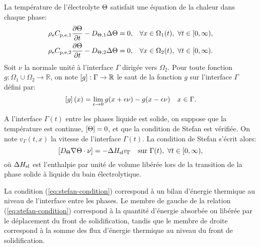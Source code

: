 La température de l'électrolyte $\Theta$ satisfait une équation
de la chaleur dans chaque phase:
\begin{align}
  &\rho_\mathrm{e}C_{\mathrm{p,e,1}} \frac{\partial
    \Theta}{\partial t} - D_{\Theta,\mathrm{1}} \Delta\Theta
  = 0, & \forall x \in \Omega_1(t),\ \forall t\in [0,\infty),\label{eq:heat-solid-phase}\\
    &\rho_\mathrm{e}C_{\mathrm{p,e,2}} \frac{\partial
    \Theta}{\partial t} - D_{\Theta,\mathrm{2}} \Delta\Theta
  = 0, & \forall x \in \Omega_2(t),\ \forall t\in [0,\infty).\label{eq:heat-liquid-phase}
\end{align}
Soit $\nu$ la normale unité à l'interface $\Gamma$ dirigée vers
$\Omega_2$. Pour toute fonction $g:\Omega_1\cup\Omega_2\to\mathbb R$,
on note $\left[ g \right]:\Gamma\to\mathbb R$ le saut de la fonction $g$ sur
l'interface $\Gamma$ défini par:
\begin{equation}
  \left[ g \right](x) = \lim_{\epsilon\to 0}g(x + \epsilon\nu) - g(x -
  \epsilon\nu) \quad x\in \Gamma.
\end{equation}

A l'interface $\Gamma(t)$ entre les phases liquide est solide, on
suppose que la température est continue, $\left[ \Theta \right] = 0$, et
que la condition de Stefan est vérifiée. On note $v_\Gamma(t, x)$ la
vitesse de l'interface $\Gamma(t)$. La condition de Stefan s'écrit
alors:
\begin{equation}
  \jump{\electrolytetdiff\nabla\temperature \cdot \nu} %
  = - \fusionenthalpy v_\Gamma\quad\text{sur }\Gamma(t),\ \forall t\in[0,\infty),
  \label{eq:stefan-condition}
\end{equation}
où $\Delta H_\mathrm{sl}$ est l'enthalpie par unité de volume
libérée lors de la transition de la phase solide à liquide du
bain électrolytique.

La condition (\ref{eq:stefan-condition}) correspond à un bilan
d'énergie thermique au niveau de l'interface entre les phases. Le
membre de gauche de la relation (\ref{eq:stefan-condition}) correspond
à la quantité d'énergie absorbée ou libérée par le déplacement du
front de solidification, tandis que le membre de droite correspond à
la somme des flux d'énergie thermique au niveau du front de
solidification.

